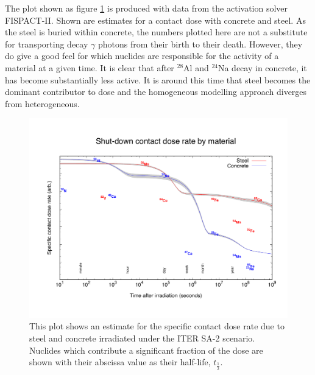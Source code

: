 The plot shown as figure \ref{fig:contact_dose} is produced with data from the activation solver FISPACT-II. Shown are estimates for a contact dose with concrete and steel. As the steel is buried within concrete, the numbers plotted here are not a substitute for transporting decay $\gamma$ photons from their birth to their death. However, they do give a good feel for which nuclides are responsible for the activity of a material at a given time. It is clear that after $^{28}$Al and $^{24}$Na decay in concrete, it has become substantially less active. It is around this time that steel becomes the dominant contributor to dose and the homogeneous modelling approach diverges from heterogeneous.

\begin{figure}[H]
  \includegraphics[width=\textwidth]{contact_dose_by_mat}
  \caption{This plot shows an estimate for the specific contact dose rate due to steel and concrete irradiated under the ITER SA-2 scenario. Nuclides which contribute a significant fraction of the dose are shown with their abscissa value as their half-life, $t_{\frac{1}{2}}$.}
  \label{fig:contact_dose}
\end{figure}


